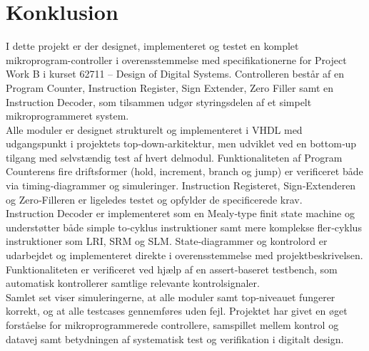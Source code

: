 \documentclass{article}
\begin{document}
\fi

\section{Konklusion}
\label{sec:conclusion}
I dette projekt er der designet, implementeret og testet en komplet mikroprogram-controller i overensstemmelse med specifikationerne for Project Work B i kurset 62711 – Design of Digital Systems. Controlleren består af en Program Counter, Instruction Register, Sign Extender, Zero Filler samt en Instruction Decoder, som tilsammen udgør styringsdelen af et simpelt mikroprogrammeret system.
\\
Alle moduler er designet strukturelt og implementeret i VHDL med udgangspunkt i projektets top‑down‑arkitektur, men udviklet ved en bottom‑up tilgang med selvstændig test af hvert delmodul. Funktionaliteten af Program Counterens fire driftsformer (hold, increment, branch og jump) er verificeret både via timing‑diagrammer og simuleringer. Instruction Registeret, Sign‑Extenderen og Zero‑Filleren er ligeledes testet og opfylder de specificerede krav.
\\
Instruction Decoder er implementeret som en Mealy‑type finit state machine og understøtter både simple to‑cyklus instruktioner samt mere komplekse fler‑cyklus instruktioner som LRI, SRM og SLM. State‑diagrammer og kontrolord er udarbejdet og implementeret direkte i overensstemmelse med projektbeskrivelsen. Funktionaliteten er verificeret ved hjælp af en assert‑baseret testbench, som automatisk kontrollerer samtlige relevante kontrolsignaler.
\\
Samlet set viser simuleringerne, at alle moduler samt top‑niveauet fungerer korrekt, og at alle testcases gennemføres uden fejl. Projektet har givet en øget forståelse for mikroprogrammerede controllere, samspillet mellem kontrol og datavej samt betydningen af systematisk test og verifikation i digitalt design.
\ifdefined\mainfile\else
\end{document}
